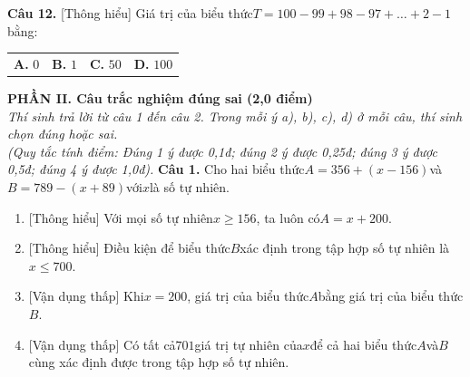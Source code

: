 \documentclass[11pt,a4paper]{article}
\begin{document}
\noindent\textbf{Câu 12.} [Thông hiểu] Giá trị của biểu thức$T = 100 - 99 + 98 - 97 + \dots + 2 - 1$bằng:\par\vspace{2pt}
\noindent\begin{tabular*}{\textwidth}{@{\extracolsep{\fill}}llll@{}}
\textbf{A.} $0$ & \textbf{B.} $1$ & \textbf{C.} $50$ & \textbf{D.} $100$
\end{tabular*}\par\vspace{5pt}


\vspace{6pt}
\noindent
\textbf{\large PHẦN II. Câu trắc nghiệm đúng sai (2,0 điểm)}\\
\textit{\small Thí sinh trả lời từ câu 1 đến câu 2. Trong mỗi ý a), b), c), d) ở mỗi câu, thí sinh chọn đúng hoặc sai.}\\
\textit{\small (Quy tắc tính điểm: Đúng 1 ý được 0,1đ; đúng 2 ý được 0,25đ; đúng 3 ý được 0,5đ; đúng 4 ý được 1,0đ).}
\vspace{6pt}
\noindent\textbf{Câu 1.} Cho hai biểu thức$A = 356 + (x - 156)$và$B = 789 - (x + 89)$với$x$là số tự nhiên.\par\vspace{2pt}
\begin{enumerate}[label=\textbf{\alph*)}, leftmargin=1.2cm, itemsep=2pt, topsep=2pt]
  \item \textnormal{[Thông hiểu]} Với mọi số tự nhiên$x \ge 156$, ta luôn có$A = x + 200$.
  \item \textnormal{[Thông hiểu]} Điều kiện để biểu thức$B$xác định trong tập hợp số tự nhiên là$x \le 700$.
  \item \textnormal{[Vận dụng thấp]} Khi$x = 200$, giá trị của biểu thức$A$bằng giá trị của biểu thức$B$.
  \item \textnormal{[Vận dụng thấp]} Có tất cả$701$giá trị tự nhiên của$x$để cả hai biểu thức$A$và$B$cùng xác định được trong tập hợp số tự nhiên.
\end{enumerate}
\vspace{6pt}
\end{document}
